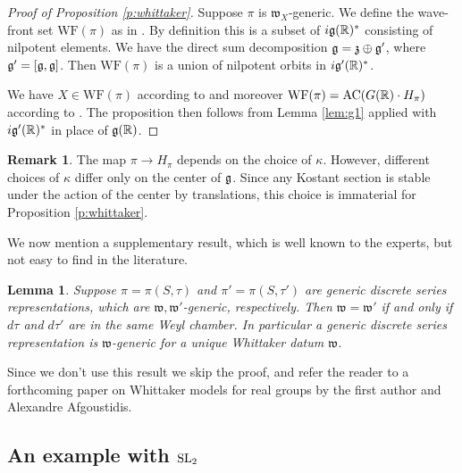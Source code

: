 \documentclass{article}
\newtheorem{lem}[thm]{Lemma}
\theoremstyle{definition}
\newtheorem{rem}[thm]{Remark}
\numberwithin{equation}{section}
\renewcommand{\-}{\hyp{}}
\newcommand{\warn}[1]{{\leavevmode\color{red}[#1]}}
\newcommand{\g}{\mathfrak g}
\newcommand{\w}{\mathfrak w}
\newcommand{\WF}{\mathrm{WF}}
\newcommand{\AC}{\mathrm{AC}}
\begin{document}
\begin{proof}[Proof of Proposition \ref{p:whittaker}]

Suppose $\pi$ is $\w_X$-generic.
	We define the wave-front set $\WF(\pi)$ as in \cite[Section 3]{matumoto}. By definition this is a subset of $i\g(\R)^*$ consisting of nilpotent elements. We have the direct sum decomposition $\g = \mf{z} \oplus \mf{g}'$, where $\mathfrak{g}'=[\mathfrak{g},\mathfrak{g}]$. Then $\WF(\pi)$ is a union of nilpotent orbits in $i\g'(\R)^*$.

We have $X\in \WF(\pi)$ according to \cite[Theorem A]{matumoto} and moreover $\WF(\pi)=\AC(G(\R)\cdot H_\pi)$ according to \cite[Theorem 1.2]{harris}. The proposition then follows from Lemma \ref{lem:g1} applied with $i\g'(\R)^*$ in place of $\g(\R)$.
%
\end{proof}


\begin{rem}
  The map $\pi\rightarrow H_\pi$ depends on the choice of $\kappa$. However, different choices of $\kappa$ differ only on the center of $\mathfrak{g}$. Since any Kostant section is stable under the action of the center by translations, this choice is immaterial for Proposition \ref{p:whittaker}.
\end{rem}

We now mention  a supplementary result, which is well known to the experts, but not easy to find in the literature.

\begin{lem} \label{lem:g2}
    Suppose $\pi=\pi(S,\tau)$ and $\pi'=\pi(S,\tau')$ are generic discrete series representations, which are $\w, \w'$-generic, respectively.
    Then $\w=\w'$ if and only if $d\tau$ and $d\tau'$ are in the same Weyl chamber. In particular a generic discrete series representation is $\w$-generic
    for a unique Whittaker datum $\w$.
\end{lem}

Since we don't use this result we skip the proof, and refer the reader to a forthcoming paper on Whittaker models for real groups
by the first author and Alexandre Afgoustidis.


\subsection{An example with $\textrm{SL}_2$}
\end{document}
